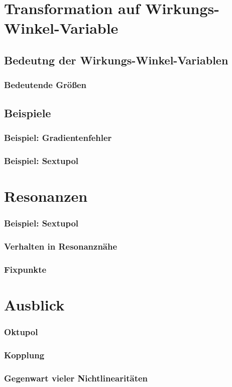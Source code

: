 \documentclass[hyperref={pdfpagelabels=false}]{beamer}
\begin{document}
\section{Transformation auf Wirkungs-Winkel-Variable}
\subsection{Bedeutng der Wirkungs-Winkel-Variablen}
\begin{frame}
 \frametitle{Bedeutende Größen}
\end{frame}

\subsection{Beispiele}
\begin{frame}
 \frametitle{Beispiel: Gradientenfehler}
\end{frame}

\begin{frame}
 \frametitle{Beispiel: Sextupol}
\end{frame}

\section{Resonanzen}
\begin{frame}
 \frametitle{Beispiel: Sextupol}
\end{frame}

\begin{frame}
 \frametitle{Verhalten in Resonanznähe}
\end{frame}

\begin{frame}
 \frametitle{Fixpunkte}
\end{frame}

\section{Ausblick}
\begin{frame}
 \frametitle{Oktupol}
\end{frame}

\begin{frame}
 \frametitle{Kopplung}
\end{frame}

\begin{frame}
 \frametitle{Gegenwart vieler Nichtlinearitäten}
\end{frame}
\end{document}
